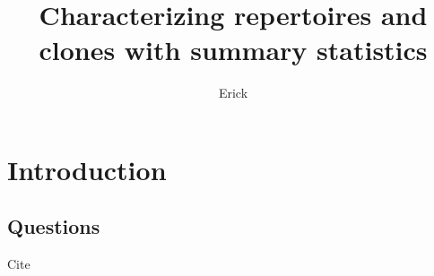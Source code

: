 \documentclass{article}
\title{Characterizing repertoires and clones with summary statistics}
\author{Erick}
\begin{document}
\maketitle

\section*{Introduction}


\subsection*{Questions}

Cite \cite{Felsenstein1981-zs}



\end{document}
